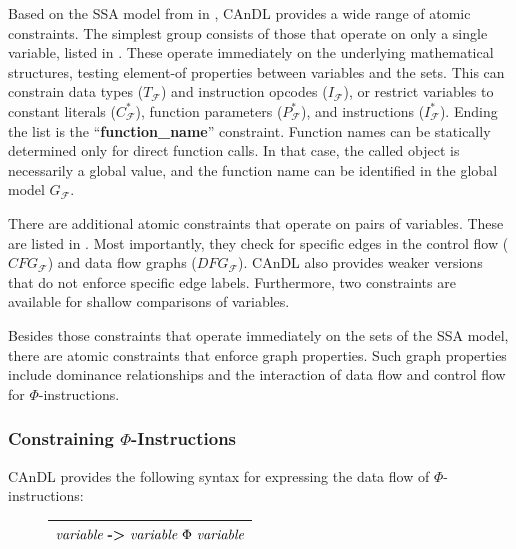     Based on the SSA model from  in ,
    CAnDL provides a wide range of atomic constraints.
    The simplest group consists of those that operate on only a single variable,
    listed in .
    These operate immediately on the underlying mathematical structures, testing
    element-of properties between variables and the sets.
    This can constrain data types ($T_\mathcal{F}$) and 
    instruction opcodes ($I_\mathcal{F}$), or 
    restrict variables to constant literals ($C_\mathcal{F}^*$), function
    parameters ($P_\mathcal{F}^*$), and instructions ($I_\mathcal{F}^*$).
    Ending the list is the ``{\bf function\_name}'' constraint.
    Function names can be statically determined only for direct function calls.
    In that case, the called object is necessarily a global value, and the
    function name can be identified in the global model $G_\mathcal F$.

    There are additional atomic constraints that operate on pairs of variables.
    These are listed in .
    Most importantly, they check for specific edges in the control flow
    ($CFG_\mathcal F$) and data flow graphs ($DFG_\mathcal F$).
    CAnDL also provides weaker versions that do not enforce specific edge
    labels.
    Furthermore, two constraints are available for shallow comparisons of
    variables.

    Besides those constraints that operate immediately on the sets of the
    SSA model, there are atomic constraints that enforce graph properties.
    Such graph properties include dominance relationships and the interaction of
    data flow and control flow for $\Phi$-instructions.

\subsubsection{Constraining $\Phi$-Instructions}

    CAnDL provides the following syntax for expressing the data flow
    of $\Phi$-instructions:
\begin{figure}[h]
    \centering
    \begin{tabular}{|c|}
        \hline
        $\text{\it variable}\ \text{\bf ->}\ \text{\it variable}\ \Phi\ \text{\it variable}$\\
        \hline
    \end{tabular}
\end{figure}

